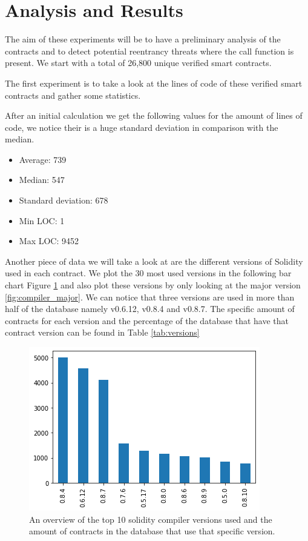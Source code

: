 \documentclass[sigconf]{acmart}
\begin{document}
\section{Analysis and Results}

The aim of these experiments will be to have a preliminary analysis of the contracts and to detect potential reentrancy threats where the call function is present. We start with a total of 26,800 unique verified smart contracts. 



The first experiment is to take a look at the lines of code of these verified smart contracts and gather some statistics.

After an initial calculation we get the following values for the amount of lines of code, we notice their is a huge standard deviation in comparison with the median.
\begin{itemize}
    \item Average: 739
    \item Median: 547
    \item Standard deviation: 678
    \item Min LOC: 1
    \item Max LOC: 9452
\end{itemize}

Another piece of data we will take a look at are the different versions of Solidity used in each contract. We plot the 30 most used versions in the following bar chart Figure \ref{fig:compiler} and also plot these versions by only looking at the major version \ref{fig:compiler_major}. We can notice that three versions are used in more than half of the database namely v0.6.12, v0.8.4 and v0.8.7. The specific amount of contracts for each version and the percentage of the database that have that contract version can be found in Table \ref{tab:versions}
\begin{figure}[h]
  \centering
  \includegraphics[width=\linewidth]{img/versions_v3.png}
  \caption{An overview of the top 10 solidity compiler versions used and the amount of contracts in the database that use that specific version. }
  \label{fig:compiler}
\end{figure}
\end{document}

